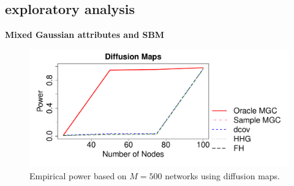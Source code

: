 \documentclass[12pt]{article}
\theoremstyle{definition}
\begin{document}
\subsection{exploratory analysis}



\textbf{Mixed Gaussian attributes and SBM}


\begin{figure}[H]
	\centering
	\includegraphics[width=5in]{../Figure/tmp_gaus.pdf}
	\caption{Empirical power based on $M = 500$ networks using diffusion maps.}
	\label{fig:threeSBM}
\end{figure}
\end{document}
